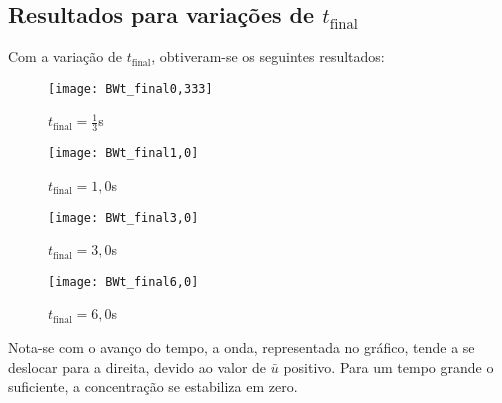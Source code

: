 \subsection{Resultados para variações de $t_{\text{final}}$}
Com a variação de $t_{\text{final}}$, obtiveram-se os seguintes resultados:
\begin{figure}[H]
    \centering
    \texttt{[image: BWt\_final0,333]}
    \caption{$t_{\text{final}} = \frac{1}{3}$s}
\end{figure}
\begin{figure}[H]
    \centering
    \texttt{[image: BWt\_final1,0]}
    \caption{$t_{\text{final}} = 1,0$s}
\end{figure}
\begin{figure}[H]
    \centering
    \texttt{[image: BWt\_final3,0]}
    \caption{$t_{\text{final}} = 3,0$s}
\end{figure}
\begin{figure}[H]
    \centering
    \texttt{[image: BWt\_final6,0]}
    \caption{$t_{\text{final}} = 6,0$s}
\end{figure}
Nota-se com o avanço do tempo, a onda, representada no gráfico, tende a se
deslocar para a direita, devido ao valor de $\bar{u}$ positivo. Para um tempo
grande o suficiente, a concentração se estabiliza em zero.